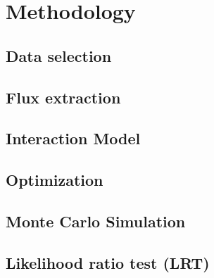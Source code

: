 \chapter{Methodology}

\section{Data selection}

\section{Flux extraction}

\section{Interaction Model}

\section{Optimization}


\section{Monte Carlo Simulation}


\section{Likelihood ratio test (LRT)}


